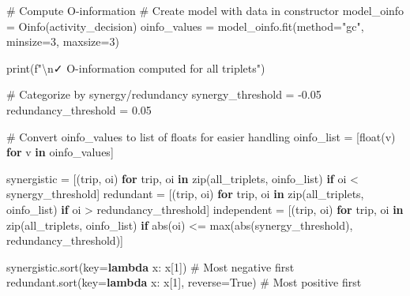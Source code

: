 \documentclass[
  11pt,
  letterpaper,
  oneside,
  openany]{book}
\newenvironment{Shaded}{\begin{snugshade}}{\end{snugshade}}
\newcommand{\BuiltInTok}[1]{\textcolor[rgb]{0.00,0.23,0.31}{#1}}
\newcommand{\CharTok}[1]{\textcolor[rgb]{0.13,0.47,0.30}{#1}}
\newcommand{\CommentTok}[1]{\textcolor[rgb]{0.37,0.37,0.37}{#1}}
\newcommand{\ControlFlowTok}[1]{\textcolor[rgb]{0.00,0.23,0.31}{\textbf{#1}}}
\newcommand{\DecValTok}[1]{\textcolor[rgb]{0.68,0.00,0.00}{#1}}
\newcommand{\FloatTok}[1]{\textcolor[rgb]{0.68,0.00,0.00}{#1}}
\newcommand{\KeywordTok}[1]{\textcolor[rgb]{0.00,0.23,0.31}{\textbf{#1}}}
\newcommand{\NormalTok}[1]{\textcolor[rgb]{0.00,0.23,0.31}{#1}}
\newcommand{\OperatorTok}[1]{\textcolor[rgb]{0.37,0.37,0.37}{#1}}
\newcommand{\SpecialStringTok}[1]{\textcolor[rgb]{0.13,0.47,0.30}{#1}}
\newcommand{\StringTok}[1]{\textcolor[rgb]{0.13,0.47,0.30}{#1}}
\newcommand{\VariableTok}[1]{\textcolor[rgb]{0.07,0.07,0.07}{#1}}
\begin{document}
\begin{Shaded}
\begin{Highlighting}[]
\CommentTok{\# Compute O{-}information}
\CommentTok{\# Create model with data in constructor}
\NormalTok{model\_oinfo }\OperatorTok{=}\NormalTok{ Oinfo(activity\_decision)}
\NormalTok{oinfo\_values }\OperatorTok{=}\NormalTok{ model\_oinfo.fit(method}\OperatorTok{=}\StringTok{"gc"}\NormalTok{, minsize}\OperatorTok{=}\DecValTok{3}\NormalTok{, maxsize}\OperatorTok{=}\DecValTok{3}\NormalTok{)}

\BuiltInTok{print}\NormalTok{(}\SpecialStringTok{f"}\CharTok{\textbackslash{}n}\SpecialStringTok{✓ O{-}information computed for all triplets"}\NormalTok{)}

\CommentTok{\# Categorize by synergy/redundancy}
\NormalTok{synergy\_threshold }\OperatorTok{=} \OperatorTok{{-}}\FloatTok{0.05}
\NormalTok{redundancy\_threshold }\OperatorTok{=} \FloatTok{0.05}

\CommentTok{\# Convert oinfo\_values to list of floats for easier handling}
\NormalTok{oinfo\_list }\OperatorTok{=}\NormalTok{ [}\BuiltInTok{float}\NormalTok{(v) }\ControlFlowTok{for}\NormalTok{ v }\KeywordTok{in}\NormalTok{ oinfo\_values]}

\NormalTok{synergistic }\OperatorTok{=}\NormalTok{ [(trip, oi) }\ControlFlowTok{for}\NormalTok{ trip, oi }\KeywordTok{in} \BuiltInTok{zip}\NormalTok{(all\_triplets, oinfo\_list) }
               \ControlFlowTok{if}\NormalTok{ oi }\OperatorTok{\textless{}}\NormalTok{ synergy\_threshold]}
\NormalTok{redundant }\OperatorTok{=}\NormalTok{ [(trip, oi) }\ControlFlowTok{for}\NormalTok{ trip, oi }\KeywordTok{in} \BuiltInTok{zip}\NormalTok{(all\_triplets, oinfo\_list)}
            \ControlFlowTok{if}\NormalTok{ oi }\OperatorTok{\textgreater{}}\NormalTok{ redundancy\_threshold]}
\NormalTok{independent }\OperatorTok{=}\NormalTok{ [(trip, oi) }\ControlFlowTok{for}\NormalTok{ trip, oi }\KeywordTok{in} \BuiltInTok{zip}\NormalTok{(all\_triplets, oinfo\_list)}
              \ControlFlowTok{if} \BuiltInTok{abs}\NormalTok{(oi) }\OperatorTok{\textless{}=} \BuiltInTok{max}\NormalTok{(}\BuiltInTok{abs}\NormalTok{(synergy\_threshold), redundancy\_threshold)]}

\NormalTok{synergistic.sort(key}\OperatorTok{=}\KeywordTok{lambda}\NormalTok{ x: x[}\DecValTok{1}\NormalTok{])  }\CommentTok{\# Most negative first}
\NormalTok{redundant.sort(key}\OperatorTok{=}\KeywordTok{lambda}\NormalTok{ x: x[}\DecValTok{1}\NormalTok{], reverse}\OperatorTok{=}\VariableTok{True}\NormalTok{)  }\CommentTok{\# Most positive first}


\end{Highlighting}
\end{Shaded}
\end{document}
